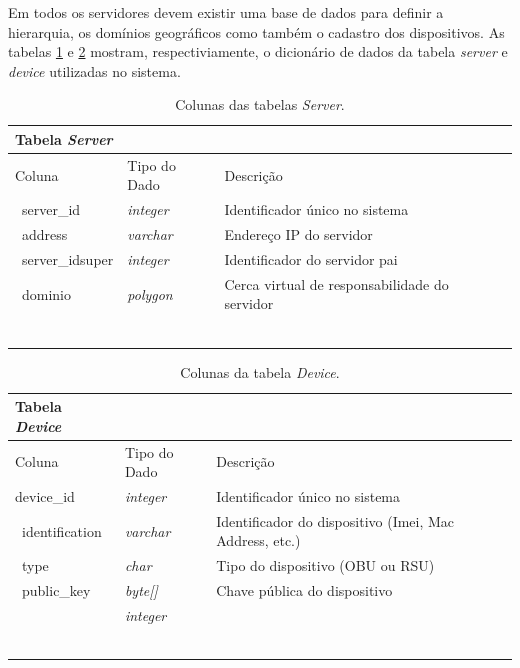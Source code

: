 \documentclass[
	12pt,				%
	oneside,			%
	a4paper,			%
	english,			%
	brazil				%
	]{abntex2ppgsi}
\begin{document}
Em todos os servidores devem existir uma base de dados para definir a hierarquia, os domínios geográficos como também o cadastro dos dispositivos. As tabelas \ref{tab:serverTable} e \ref{tab:deviceTable} mostram, respectiviamente, o dicionário de dados da tabela \textit{server} e \textit{device} utilizadas no sistema.

\begin{longtable}{ p{}  p{}   p{}  p{}} 
	\hline
	\rowcolor[gray]{0.7}
	Tabela \textit{Server}	& 	&  \\ \hline
	\rowcolor[gray]{0.7}
	Coluna	& Tipo do Dado	& Descrição \\ \
	server\_id	& \textit{integer} & Identificador único no sistema 	\\ \
	address	& \textit{varchar}	& Endereço IP do servidor \\ \
	server\_idsuper	& \textit{integer} & Identificador do servidor pai 	\\ \	
	dominio	& \textit{polygon} & Cerca virtual de responsabilidade do servidor	\\ \	\\ \hline
	\caption{Colunas das tabelas \textit{Server}. } %
	\label{tab:serverTable}
\end{longtable}

\newpage

\begin{longtable}{ p{}  p{}   p{}  p{}} 
	\hline
	\rowcolor[gray]{0.7}
	Tabela \textit{Device}	& 	&  \\ \hline
	\rowcolor[gray]{0.7}	
	Coluna	& Tipo do Dado	& Descrição \\ \hline
	device\_id	& \textit{integer} & Identificador único no sistema	\\ \
    identification	& \textit{varchar} & Identificador do dispositivo (Imei, Mac Address, etc.)	\\ \
    type	& \textit{char} & Tipo do dispositivo (OBU ou RSU)	\\ \
    public\_key	& \textit{byte[]} &  Chave pública do dispositivo	\\ \
		& \textit{integer} & 	\\ \	\\ \hline
	\caption{Colunas da tabela \textit{Device}. } %
	\label{tab:deviceTable}
\end{longtable}
\end{document}

